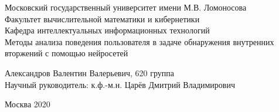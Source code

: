 \begin{center} 

\large Московский государственный университет имени М.В. Ломоносова\\
Факультет вычислительной математики и кибернетики\\
Кафедра интеллектуальных информационных технологий\\[5.5cm] 

\huge Методы анализа поведения пользователя в задаче обнаружения внутренних вторжений с помощью нейросетей \\[0.6cm] %


\end{center} 

\begin{flushright}
Александров Валентин Валерьевич, 620 группа \\
Научный руководитель: к.ф.-м.н. Царёв Дмитрий Владимирович \\
\end{flushright}


\vfill 

\begin{center} 
\large Москва 2020
\end{center} 

\thispagestyle{empty}